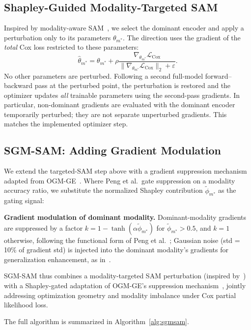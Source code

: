 \documentclass[runningheads]{llncs}
\begin{document}
\subsection{Shapley-Guided Modality-Targeted SAM}
Inspired by modality-aware SAM~\cite{rajoli2025msam}, we select
the dominant encoder and apply a perturbation only to its
parameters $\theta_{m^*}$. The direction uses the gradient
of the \emph{total} Cox loss restricted to these parameters:
\begin{equation}
\hat{\theta}_{m^*}=\theta_{m^*}+
\rho\frac{\nabla_{\theta_{m^*}}\mathcal{L}_{\mathrm{Cox}}}
{\|\nabla_{\theta_{m^*}}\mathcal{L}_{\mathrm{Cox}}\|_2+\varepsilon}.
\label{eq:targetedsam}
\end{equation}
No other parameters are perturbed. Following a second full-model
forward--backward pass at the perturbed point, the perturbation
is restored and the optimizer updates \emph{all} trainable
parameters using the second-pass gradients. In particular,
non-dominant gradients are evaluated with the dominant encoder
temporarily perturbed; they are not separate unperturbed
gradients. This matches the implemented optimizer step.

\subsection{SGM-SAM: Adding Gradient Modulation}

We extend the targeted-SAM step above with a gradient suppression
mechanism adapted from OGM-GE~\cite{peng2022ogm}. Where Peng et al.\
gate suppression on a modality accuracy ratio, we substitute the
normalized Shapley contribution $\tilde\phi_{m^*}$ as the gating signal:

\textbf{Gradient modulation of dominant modality.}
Dominant-modality gradients are suppressed by a factor
$k=1-\tanh(\alpha\tilde\phi_{m^*})$ for
$\tilde\phi_{m^*}>0.5$, and $k=1$ otherwise, following the
functional form of Peng et al.~\cite{peng2022ogm}; Gaussian noise
(std = 10\% of gradient std) is injected into the dominant modality's
gradients for generalization enhancement, as in~\cite{peng2022ogm}.

SGM-SAM thus combines a modality-targeted SAM perturbation (inspired
by~\cite{rajoli2025msam}) with a Shapley-gated adaptation of
OGM-GE's suppression mechanism~\cite{peng2022ogm}, jointly addressing
optimization geometry and modality imbalance under Cox partial
likelihood loss.

The full algorithm is summarized in Algorithm~\ref{alg:sgmsam}.
\end{document}
